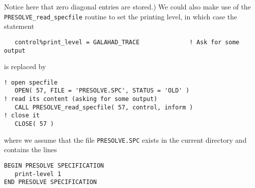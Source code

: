 \documentclass{galahad}
\newcommand{\packagename}{PRESOLVE}
\begin{document}
\noindent
Notice here that zero diagonal entries are stored.)
We could also make use of the {\tt \packagename\_read\_specfile} routine to
set the printing level, in which case the statement
{\small
\begin{verbatim}
   control%print_level = GALAHAD_TRACE              ! Ask for some output
\end{verbatim}
}
\noindent
is replaced by
{\small
\begin{verbatim}
! open specfile
   OPEN( 57, FILE = 'PRESOLVE.SPC', STATUS = 'OLD' )
! read its content (asking for some output)
   CALL PRESOLVE_read_specfile( 57, control, inform )
! close it
   CLOSE( 57 )
\end{verbatim}
}
\noindent
where we assume that the file {\tt PRESOLVE.SPC} exists in the current
directory and contains the lines
{\small
\begin{verbatim}
BEGIN PRESOLVE SPECIFICATION
   print-level 1
END PRESOLVE SPECIFICATION
\end{verbatim}
}
\end{document}
